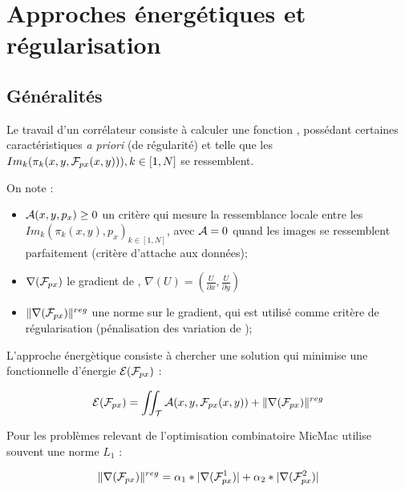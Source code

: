 \chapter{Approches \'energ\'etiques et r\'egularisation}


\section{G\'en\'eralit\'es}

\label{DUMG:Appr:Energ}

Le travail d'un corr\'elateur consiste \`a calculer une fonction
\FPx , poss\'edant certaines caract\'eristiques \emph{a priori}
(de r\'egularit\'e)  et
telle que les $Im_k(\pi_k(x,y,\FPx(x,y))),k\in [1,N]$ se ressemblent.

On note :

\begin{itemize}
     \item $\Ress(x,y,p_x) \geq 0$  un crit\`ere qui mesure la
            ressemblance locale  entre les
            $Im_k(\pi_k(x,y),p_x)_{k\in [1,N]}$, avec $\Ress=0$
            quand les images se ressemblent parfaitement (crit\`ere
            d'attache aux donn\'ees);

      \item $\nabla(\FPx)$ le gradient de \FPx,
             $\nabla(U) = (\frac{U}{\partial x}, \frac{U}{\partial y})$

      \item $\| \nabla(\FPx) \|^{reg}$ une norme sur le gradient, qui
            est utilis\'e comme crit\`ere de r\'egularisation (p\'enalisation
            des variation de \FPx);
\end{itemize}

L'approche \'energ\`etique consiste \`a chercher
une solution \FPx qui minimise une fonctionnelle d'\'energie $\Energ(\FPx)$  :

\begin{equation}
   \Energ(\FPx) = \iint_\ETer \Ress(x,y,\FPx(x,y)) + \| \nabla(\FPx) \|^{reg}
\end{equation}

Pour les probl\`emes relevant de l'optimisation combinatoire
MicMac utilise souvent une norme $L_1$ :

\begin{equation}
\label{CostGrad:Lun:DDeux2}
   \| \nabla(\FPx) \|^{reg} = \alpha_1*|\nabla(\FPx^1)|+\alpha_2*|\nabla(\FPx^2)|
\end{equation}

